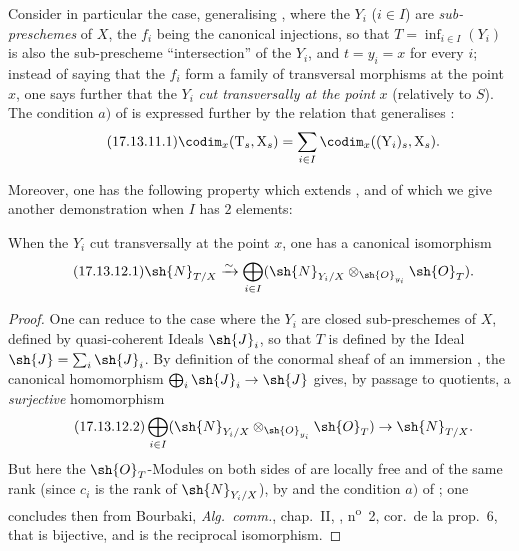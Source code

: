 \begin{env}[17.13.11]
\label{IV.17.13.11}
Consider in particular the case, generalising , where the $Y_i$ ($i\in I$) are \emph{sub-preschemes} of $X$, the $f_i$ being the canonical injections, so that $T=\inf_{i\in I}(Y_i)$ is also the sub-prescheme ``intersection'' of the $Y_i$, and $t=y_i=x$ for every $i$; instead of saying that the $f_i$ form a family of transversal morphisms at the point $x$, one says further that the $Y_i$ \emph{cut transversally at the point} $x$ (relatively to $S$).
The condition $a)$ of  is expressed further by the relation that generalises :
\[
\label{IV.17.13.11.1}
\tag{17.13.11.1}
\codim_x(\mathrm{T}_s,\mathrm{X}_s) = \sum_{i\in I}\codim_x((\mathrm{Y}_i)_s,\mathrm{X}_s).
\]

Moreover, one has the following property which extends , and of which we give another demonstration when $I$ has $2$ elements:
\end{env}

\begin{corollary}[17.13.12]
\label{IV.17.13.12}
When the $Y_i$ cut transversally at the point $x$, one has a canonical isomorphism
\[
\label{IV.17.13.12.1}
\tag{17.13.12.1}
\sh{N}_{T/X} \xrightarrow{\sim} \bigoplus_{i\in I}(\sh{N}_{Y_i/X}\otimes_{\sh{O}_{y_i}}\sh{O}_T).
\]
\end{corollary}

\begin{proof}
One can reduce to the case where the $Y_i$ are closed sub-preschemes of $X$, defined by quasi-coherent Ideals $\sh{J}_i$, so that $T$ is defined by the Ideal $\sh{J}=\sum_i\sh{J}_i$.
By definition of the conormal sheaf of an immersion , the canonical homomorphism $\bigoplus_i\sh{J}_i\to\sh{J}$ gives, by passage to quotients, a \emph{surjective} homomorphism
\[
\label{IV.17.13.12.2}
\tag{17.13.12.2}
\bigoplus_{i\in I}(\sh{N}_{Y_i/X}\otimes_{\sh{O}_{y_i}}\sh{O}_T) \to \sh{N}_{T/X}.
\]
But here the $\sh{O}_T$-Modules on both sides of  are locally free and of the same rank (since $c_i$ is the rank of $\sh{N}_{Y_i/X}$), by  and the condition $a)$ of ; one concludes then from Bourbaki, \emph{Alg.~comm.}, chap.~II, , n\textsuperscript{o}~2, cor.\ de la prop.~6, that  is bijective, and  is the reciprocal isomorphism.
\end{proof}

